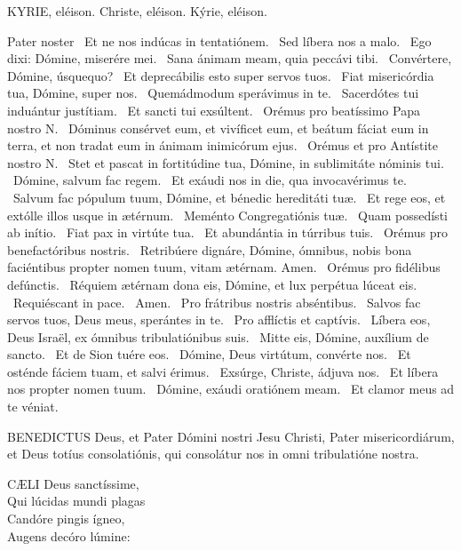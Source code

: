 \label{feria4:precesferialesvesperas}

KYRIE, eléison. Christe, eléison. Kýrie, eléison.

Pater noster  \V\ Et ne nos indúcas in tentatiónem. \R\ Sed líbera nos a malo. \V\ Ego dixi: Dómine, miserére mei. \R\ Sana ánimam meam, quia peccávi tibi. \V\ Convértere, Dómine, úsquequo? \R\ Et deprecábilis esto super servos tuos. \V\ Fiat misericórdia tua, Dómine, super nos. \R\ Quemádmodum sperávimus in te. \V\ Sacerdótes tui induántur justítiam. \R\ Et sancti tui exsúltent. \V\ Orémus pro beatíssimo Papa nostro N. \R\ Dóminus consérvet eum, et vivíficet eum, et beátum fáciat eum in terra, et non tradat eum in ánimam inimicórum ejus. \V\ Orémus et pro Antístite nostro N. \R\ Stet et pascat in fortitúdine tua, Dómine, in sublimitáte nóminis tui. \V\ Dómine, salvum fac regem. \R\ Et exáudi nos in die, qua invocavérimus te. \V\ Salvum fac pópulum tuum, Dómine, et bénedic hereditáti tuæ. \R\ Et rege eos, et extólle illos usque in ætérnum. \V\ Meménto Congregatiónis tuæ. \R\ Quam possedísti ab inítio. \V\ Fiat pax in virtúte tua. \R\ Et abundántia in túrribus tuis. \V\ Orémus pro benefactóribus nostris. \R\ Retribúere dignáre, Dómine, ómnibus, nobis bona faciéntibus propter nomen tuum, vitam ætérnam. Amen. \V\ Orémus pro fidélibus defúnctis. \R\ Réquiem ætérnam dona eis, Dómine, et lux perpétua lúceat eis. \V\ Requiéscant in pace. \R\ Amen. \V\ Pro frátribus nostris abséntibus. \R\ Salvos fac servos tuos, Deus meus, sperántes in te. \V\ Pro afflíctis et captívis. \R\ Líbera eos, Deus Israël, ex ómnibus tribulatiónibus suis. \V\ Mitte eis, Dómine, auxílium de sancto. \R\ Et de Sion tuére eos. \V\ Dómine, Deus virtútum, convérte nos. \R\ Et osténde fáciem tuam, et salvi érimus. \V\ Exsúrge, Christe, ádjuva nos. \R\ Et líbera nos propter nomen tuum. \V\ Dómine, exáudi oratiónem meam. \R\ Et clamor meus ad te véniat.




\lettrine[lines=2]{B}{ENEDICTUS} Deus, et Pater Dómini nostri Jesu Christi, Pater misericordiárum, et Deus totíus consolatiónis, qui consolátur nos in omni tribulatióne nostra.


\lettrine[lines=2]{C}{ÆLI} Deus sanctíssime,\\
Qui lúcidas mundi plagas\\
Candóre pingis ígneo,\\
Augens decóro lúmine:

